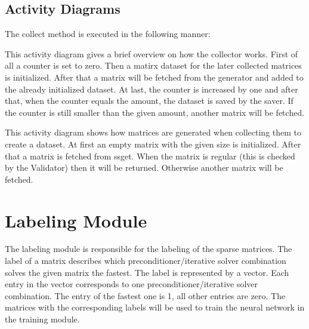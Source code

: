 \documentclass[parskip=full]{scrartcl}
\begin{document}
\subsection{Activity Diagrams}
The collect method is executed in the following manner:
\newpage
\begin{figure}[h]
\begin{center}

\label{Activity Diagrams}
\end{center}
\end{figure}
\newpage


This activity diagram gives a brief overview on how the collector works.
First of all a counter is set to zero. Then a matirx dataset for the later collected matrices is initialized.
After that a matrix will be fetched from the generator and added to the already initialized dataset.
At last, the counter is increased by one and after that, when the counter equals the amount, the dataset is saved by the saver.
If the counter is still smaller than the given amount, another matrix will be fetched. 

\newpage
\begin{figure}[h]
\begin{center}

\label{Activity Diagrams}
\end{center}
\end{figure}
\newpage

This activity diagram shows how matrices are generated when collecting them to create a dataset.
At first an empty matrix with the given size is initialized.
After that a matrix is fetched from ssget. When the matrix is regular (this is checked by the Validator) then it will be returned.
Otherwise another matrix will be fetched.

\section{Labeling Module}
The labeling module is responsible for the labeling of the sparse matrices.
The \gls{label} of a matrix describes which \gls{preconditioner}/\gls{iterative solver} combination solves the given matrix the fastest. 
The \gls{label} is represented by a vector. 
Each entry in the vector corresponds to one \gls{preconditioner}/\gls{iterative solver} combination. 
The entry of the fastest one is 1, all other entries are zero. 
The matrices with the corresponding \glspl{label} will be used to train the \gls{neural network} in the training module.
\end{document}
